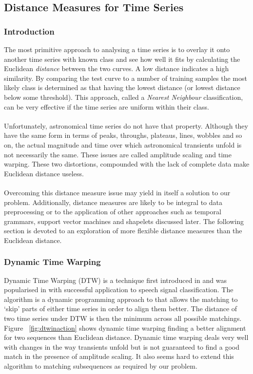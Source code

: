 	\subsection{Distance Measures for Time Series}
	\label{sec:distancemeasures}
	\subsubsection{Introduction}
	The most primitive approach to analysing a time series is to overlay it onto another time series with known class and see how well it fits by calculating the Euclidean \emph{distance} between the two curves. A low distance indicates a high similarity. By comparing the test curve to a number of training samples the most likely class is determined as that having the lowest distance (or lowest distance below some threshold). This approach, called a \emph{Nearest Neighbour} classification, can be very effective if the time series are uniform within their class. 
	\paragraph{}
	Unfortunately, astronomical time series do not have that property. Although they have the same form in terms of peaks, throughs, plateaus, lines, wobbles and so on, the actual magnitude and time over which astronomical transients unfold is not necessarily the same. These issues are called amplitude scaling and time warping. These two distortions, compounded with the lack of complete data make Euclidean distance useless. 
	\paragraph{}
	Overcoming this distance measure issue may yield in itself a solution to our problem. Additionally, distance measures are likely to be integral to data preprocessing or to the application of other approaches such as temporal grammars, support vector machines and shapelets discussed later. The following section is devoted to an exploration of more flexible distance measures than the Euclidean distance.
	
	\subsubsection{Dynamic Time Warping}
	Dynamic Time Warping (DTW) is a technique first introduced in \citep{sakoe1978dynamic} and was popularised in \citep{berndt1994using} with successful application to speech signal classification. The algorithm is a dynamic programming approach to that allows the matching to `skip' parts of either time series in order to align them better. The distance of two time series under DTW is then the minimum across all possible matchings. Figure ~\ref{fig:dtwinaction} shows dynamic time warping finding a better alignment for two sequences than Euclidean distance. Dynamic time warping deals very well with changes in the way transients unfold but is not guaranteed to find a good match in the presence of amplitude scaling. It also seems hard to extend this algorithm to matching subsequences as required by our problem.

